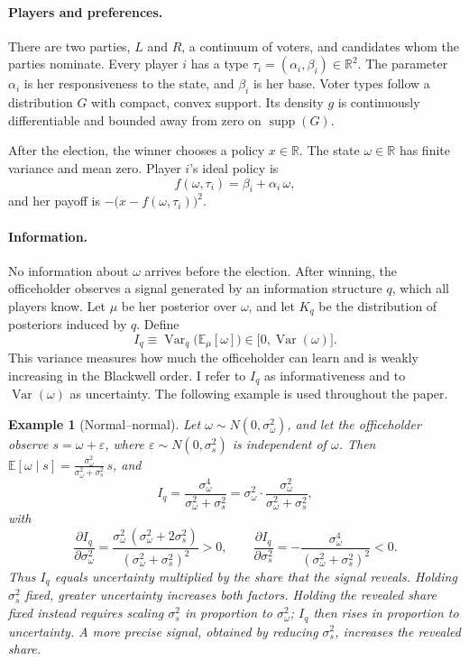 \documentclass[12pt,letterpaper]{article}
\newtheorem{example}{Example}
\begin{document}
\paragraph{Players and preferences.}
There are two parties, $L$ and $R$, a continuum of voters, and candidates whom the parties nominate. Every player $i$ has a type $\tau_i=(\alpha_i,\beta_i)\in\mathbb{R}^2$. The parameter $\alpha_i$ is her responsiveness to the state, and $\beta_i$ is her base. Voter types follow a distribution $G$ with compact, convex support. Its density $g$ is continuously differentiable and bounded away from zero on $\operatorname{supp}(G)$.

After the election, the winner chooses a policy $x\in\mathbb{R}$. The state $\omega\in\mathbb{R}$ has finite variance and mean zero. Player $i$'s ideal policy is
\[
f(\omega,\tau_i)=\beta_i+\alpha_i\,\omega ,
\]
and her payoff is $-\big(x-f(\omega,\tau_i)\big)^2$.

\paragraph{Information.}
No information about $\omega$ arrives before the election. After winning, the officeholder observes a signal generated by an information structure $q$, which all players know. Let $\mu$ be her posterior over $\omega$, and let $K_q$ be the distribution of posteriors induced by $q$. Define
\[
I_q\equiv\operatorname{Var}_q\!\big(\mathbb{E}_\mu[\omega]\big)\in\big[0,\operatorname{Var}(\omega)\big].
\]
This variance measures how much the officeholder can learn and is weakly increasing in the Blackwell order. I refer to $I_q$ as informativeness and to $\operatorname{Var}(\omega)$ as uncertainty. The following example is used throughout the paper.

\begin{example}[Normal--normal]\label{ex:normal}
Let $\omega\sim N(0,\sigma_\omega^2)$, and let the officeholder observe $s=\omega+\varepsilon$, where $\varepsilon\sim N(0,\sigma_s^2)$ is independent of $\omega$. Then $\mathbb{E}[\omega\mid s]=\frac{\sigma_\omega^2}{\sigma_\omega^2+\sigma_s^2}\,s$, and
\[
I_q=\frac{\sigma_\omega^4}{\sigma_\omega^2+\sigma_s^2}=\sigma_\omega^2\cdot\frac{\sigma_\omega^2}{\sigma_\omega^2+\sigma_s^2},
\]
with
\[
\frac{\partial I_q}{\partial\sigma_\omega^2}=\frac{\sigma_\omega^2\,(\sigma_\omega^2+2\sigma_s^2)}{(\sigma_\omega^2+\sigma_s^2)^2}>0,
\qquad
\frac{\partial I_q}{\partial\sigma_s^2}=-\frac{\sigma_\omega^4}{(\sigma_\omega^2+\sigma_s^2)^2}<0 .
\]
Thus $I_q$ equals uncertainty multiplied by the share that the signal reveals. Holding $\sigma_s^2$ fixed, greater uncertainty increases both factors. Holding the revealed share fixed instead requires scaling $\sigma_s^2$ in proportion to $\sigma_\omega^2$; $I_q$ then rises in proportion to uncertainty. A more precise signal, obtained by reducing $\sigma_s^2$, increases the revealed share.
\end{example}
\end{document}
